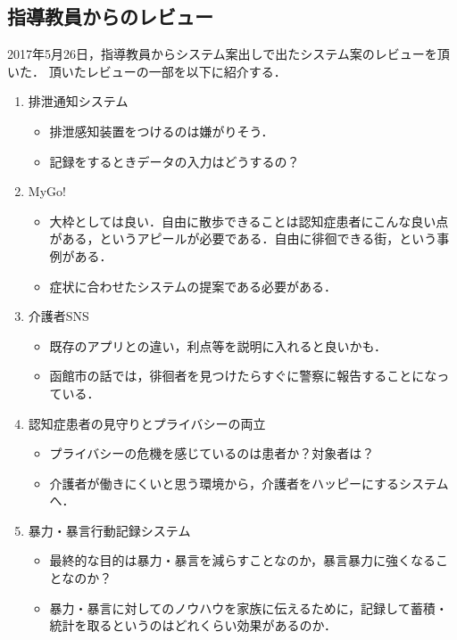\documentclass[../report]{subfiles}
\begin{document}
\subsection{指導教員からのレビュー}
2017年5月26日，指導教員からシステム案出しで出たシステム案のレビューを頂いた．
頂いたレビューの一部を以下に紹介する．
\begin{enumerate}
    \item 排泄通知システム
        \begin{itemize}
            \item 排泄感知装置をつけるのは嫌がりそう．
            \item 記録をするときデータの入力はどうするの？
        \end{itemize}
    \item MyGo!
        \begin{itemize}
            \item 大枠としては良い．自由に散歩できることは認知症患者にこんな良い点がある，というアピールが必要である．自由に徘徊できる街，という事例がある\cite{haikai}．
            \item 症状に合わせたシステムの提案である必要がある．
        \end{itemize}
    \item 介護者SNS
        \begin{itemize}
            \item 既存のアプリとの違い，利点等を説明に入れると良いかも．
            \item 函館市の話では，徘徊者を見つけたらすぐに警察に報告することになっている．
        \end{itemize}
    \item 認知症患者の見守りとプライバシーの両立
        \begin{itemize}
            \item プライバシーの危機を感じているのは患者か？対象者は？
            \item 介護者が働きにくいと思う環境から，介護者をハッピーにするシステムへ．
        \end{itemize}
    \item 暴力・暴言行動記録システム
        \begin{itemize}
            \item 最終的な目的は暴力・暴言を減らすことなのか，暴言暴力に強くなることなのか？
            \item 暴力・暴言に対してのノウハウを家族に伝えるために，記録して蓄積・統計を取るというのはどれくらい効果があるのか．
        \end{itemize}
\end{enumerate}
\end{document}
